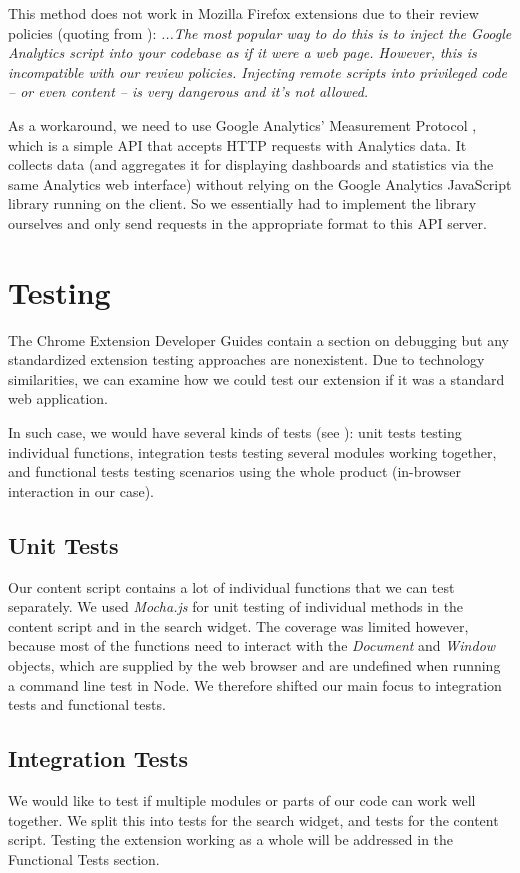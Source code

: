\documentclass[bsc,frontabs,twoside,singlespacing,parskip,deptreport]{infthesis}
\begin{document}
This method does not work in Mozilla Firefox extensions due to their review policies (quoting from \cite{A20}): \textit{...The most popular way to do this is to inject the Google Analytics script into your codebase as if it were a web page. However, this is incompatible with our review policies. Injecting remote scripts into privileged code – or even content – is very dangerous and it’s not allowed.}

As a workaround, we need to use Google Analytics' Measurement Protocol \cite{A21}, which is a simple API that accepts HTTP requests with Analytics data. It collects data (and aggregates it for displaying dashboards and statistics via the same Analytics web interface) without relying on the Google Analytics JavaScript library running on the client. So we essentially had to implement the library ourselves and only send requests in the appropriate format to this API server.

\section{Testing}
The Chrome Extension Developer Guides contain a section on debugging \cite{C3} but any standardized extension testing approaches are nonexistent. Due to technology similarities, we can examine how we could test our extension if it was a standard web application.

In such case, we would have several kinds of tests (see \cite{A11}): unit tests testing individual functions, integration tests testing several modules working together, and functional tests testing scenarios using the whole product (in-browser interaction in our case).

\subsection{Unit Tests}
Our content script contains a lot of individual functions that we can test separately. We used \textit{Mocha.js} \cite{A12} for unit testing of individual methods in the content script and in the search widget. The coverage was limited however, because most of the functions need to interact with the \textit{Document} and \textit{Window} objects, which are supplied by the web browser and are undefined when running a command line test in Node. We therefore shifted our main focus to integration tests and functional tests.

\subsection{Integration Tests}
We would like to test if multiple modules or parts of our code can work well together. We split this into tests for the search widget, and tests for the content script. Testing the extension working as a whole will be addressed in the Functional Tests section.
\end{document}
